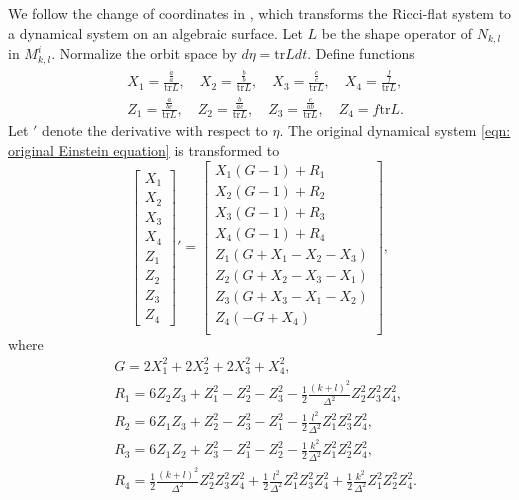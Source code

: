 \documentclass[11pt,letterpaper]{amsart}
\theoremstyle{definition}
\numberwithin{equation}{section}
\newcommand{\trace}{\mathrm{tr}}
\begin{document}
We follow the change of coordinates in \cite{chi2022spin}, which transforms the Ricci-flat system to a dynamical system on an algebraic surface. Let $L$ be the shape operator of $N_{k,l}$ in $M_{k,l}^i$. Normalize the orbit space by $d\eta=\trace{L} dt$. Define functions
\begin{equation}
\label{eqn: Xi and Zi}
\begin{split}
&X_1=\frac{\frac{\dot{a}}{a}}{\trace{L}},\quad X_2=\frac{\frac{\dot{b}}{b}}{\trace{L}},\quad X_3=\frac{\frac{\dot{c}}{c}}{\trace{L}},\quad X_4=\frac{\frac{\dot{f}}{f}}{\trace{L}},\\
&Z_1=\frac{\frac{a}{bc}}{\trace{L}},\quad 
Z_2=\frac{\frac{b}{ac}}{\trace{L}},\quad 
Z_3=\frac{\frac{c}{ab}}{\trace{L}},\quad 
Z_4=f\trace{L}.
\end{split}
\end{equation}
Let $'$ denote the derivative with respect to $\eta$. The original dynamical system \eqref{eqn: original Einstein equation} is transformed to 
\begin{equation}
\label{eqn: new Einstein equation}
\begin{bmatrix}
X_1\\
X_2\\
X_3\\
X_4\\
Z_1\\
Z_2\\
Z_3\\
Z_4
\end{bmatrix}'
=\begin{bmatrix}
X_1(G-1)+R_1\\
X_2(G-1)+R_2\\
X_3(G-1)+R_3\\
X_4(G-1)+R_4\\
Z_1(G+X_1-X_2-X_3)\\
Z_2(G+X_2-X_3-X_1)\\
Z_3(G+X_3-X_1-X_2)\\
Z_4(-G+X_4)\\
\end{bmatrix},
\end{equation}
where
\begin{equation}
\begin{split}
&G=2X_1^2+2X_2^2+2X_3^2+X_4^2,\\
&R_1=6Z_2Z_3+Z_1^2-Z_2^2-Z_3^2-\frac{1}{2}\frac{(k+l)^2}{\Delta^2}Z_2^2Z_3^2Z_4^2,\\
&R_2=6Z_1Z_3+Z_2^2-Z_3^2-Z_1^2-\frac{1}{2}\frac{l^2}{\Delta^2}Z_1^2Z_3^2Z_4^2,\\
&R_3=6Z_1Z_2+Z_3^2-Z_1^2-Z_2^2-\frac{1}{2}\frac{k^2}{\Delta^2}Z_1^2Z_2^2Z_4^2,\\
&R_4=\frac{1}{2}\frac{(k+l)^2}{\Delta^2}Z_2^2Z_3^2Z_4^2+\frac{1}{2}\frac{l^2}{\Delta^2}Z_1^2Z_3^2Z_4^2+\frac{1}{2}\frac{k^2}{\Delta^2}Z_1^2Z_2^2Z_4^2.
\end{split}
\end{equation}
\end{document}
